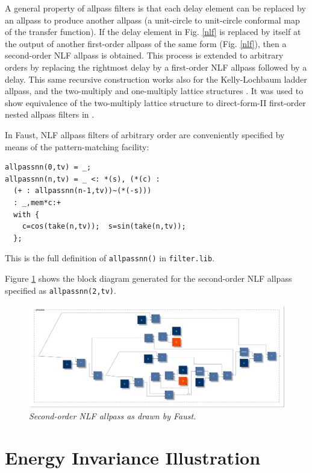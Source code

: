 \documentclass[twoside,a4paper]{article}
\begin{document}
A general property of allpass filters is that each delay element can
be replaced by an allpass to produce another allpass (a
unit-circle to unit-circle conformal map of the transfer function).  If the
delay element in Fig.{} \ref{nlf} is replaced by itself at the output
of another first-order allpass of the same form (Fig.{} \ref{nlf}),
then a second-order NLF allpass is obtained.  This process is extended
to arbitrary orders by replacing the rightmost delay by a first-order
NLF allpass followed by a delay.  This same recursive construction
works also for the Kelly-Lochbaum ladder allpass, and the
two-multiply and one-multiply lattice structures \cite{MG,PASP}.
It was used to show equivalence of the two-multiply lattice structure
to direct-form-II first-order nested allpass filters in
\cite{MassieAES93,MG}.  

In Faust, NLF allpass filters of arbitrary order are conveniently
specified by means of the pattern-matching facility:
\begin{samepage}
\begin{verbatim}
allpassnn(0,tv) = _;
allpassnn(n,tv) = _ <: *(s), (*(c) : 
  (+ : allpassnn(n-1,tv))~(*(-s))) 
  : _,mem*c:+
  with { 
    c=cos(take(n,tv));  s=sin(take(n,tv)); 
  };
\end{verbatim}
\end{samepage}
This is the full definition of \texttt{allpassnn()} in 
\texttt{filter.lib}.

Figure \ref{nlf2} shows the block diagram generated for the
second-order NLF allpass specified as \texttt{allpassnn(2,tv)}.

\begin{figure}[ht]
\center
\includegraphics[width=6.5in]{fig/nlf2.pdf}
\caption{\label{nlf2}{\it Second-order NLF allpass as drawn by Faust.}}
\end{figure} 

\section{Energy Invariance Illustration}
\end{document}

